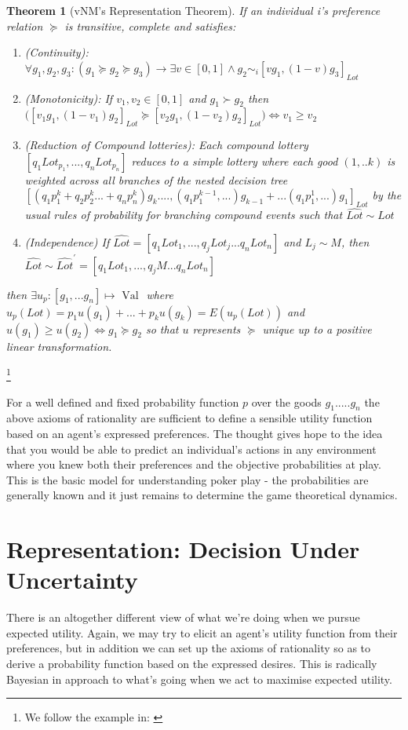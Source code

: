 \documentclass{tufte-handout}
\newtheorem{theo}[section]{Theorem}
\newenvironment{ftheo}[1]
  {\begin{mdframed}
  \sloppy
  \begin{theo}[#1]
  }
  {\end{theo}
\end{mdframed}}
\begin{document}
\begin{ftheo}{vNM's Representation Theorem}
If an individual i's preference relation $\succeq$ is transitive, complete and satisfies: \begin{enumerate}
\item (Continuity): $\forall g_{1} , g_{2} , g_{3} : ( g_{1} \succeq g_{2} \succeq g_{3}) \rightarrow \exists v \in [0, 1] \wedge g_{2} \sim_{i} [v g_{1}, (1-v) g_{3}]_{Lot}$
\item (Monotonicity): If $ v_{1}, v_{2} \in [0, 1]$ and $ g_{1} \succ g_{2}$ then  $ \Big( [ v_{1} g_{1}, (1-v_{1})g_{2}]_{Lot} \succeq [ v_{2} g_{1}, (1-v_{2})g_{2}]_{Lot} \Big) \Leftrightarrow v_{1} \geq v_{2}$
\item (Reduction of Compound lotteries): Each compound lottery ${[q_{1}Lot_{p_{1}}, ...,  q_{n}Lot_{p_{n}}]}$ reduces to a simple lottery where each good $(1, .. k)$ is weighted across all branches of the nested decision tree ${[(q_{1}p^{k}_{1} + q_{2}p^{k}_{2} ... + q_{n}p^{k}_{n})g_{k} .... , (q_{1}p^{k-1}_{1} , ...)g_{k-1} + ... (q_{1}p^{1}_{1} , ...)g_{1}]_{Lot}}$ by the usual rules of probability for branching compound events such that $\widehat{Lot} \sim Lot$ 
\item (Independence) If $\widehat{Lot} = [q_{1}Lot_{1}, ..., q_{j}Lot_{j}...q_{n}Lot_{n}]$ and $L_{j} \sim M$, then $\widehat{Lot} \sim \widehat{Lot}^{'} = [q_{1}Lot_{1}, ..., q_{j}M...q_{n}Lot_{n}]$ 
\end{enumerate}  
then $\exists u_{p} : [ g_{1}, ... g_{n}] \mapsto \text{ Val } $ where 
$ u_{p}(Lot) = p_{1}u(g_{1}) + ... + p_{k}u(g_{k}) = E(u_{p}(Lot))$ and  $u(g_{1}) \geq u(g_{2}) \Leftrightarrow g_{1} \succeq g_{2}$ so that $u$ represents $\succeq$ unique up to a positive linear transformation.
\end{ftheo}\footnote{We follow the example in: \cite{GameTheory}}

\noindent For a well defined and fixed probability function $p$ over the goods $g_{1} ..... g_{n}$ the above axioms of rationality are sufficient to define a sensible utility function based on an agent's expressed preferences. The thought gives hope to the idea that you would be able to predict an individual's actions in any environment where you knew both their preferences and the objective probabilities at play. This is the basic model for understanding poker play - the probabilities are generally known and it just remains to determine the game theoretical dynamics.

\section{Representation: Decision Under Uncertainty}
There is an altogether different view of what we're doing when we pursue expected utility. Again, we may try to elicit an agent's utility function from their preferences, but in addition we can set up the axioms of rationality so as to derive a probability function based on the expressed desires. This is radically Bayesian in approach to what's going when we act to maximise expected utility. 
\end{document}
